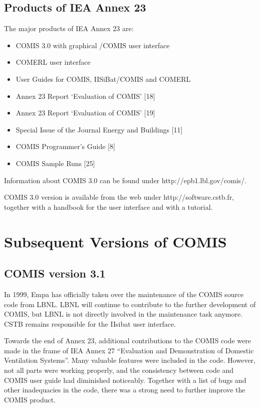 \documentclass[10pt]{book}
\begin{document}
\subsection{Products of IEA Annex 23}

The major products of IEA Annex 23 are:

\begin{itemize}
\item COMIS 3.0 with graphical /COMIS user interface
\item COMERL user interface
\item User Guides for COMIS, IISiBat/COMIS and COMERL
\item Annex 23 Report `Evaluation of COMIS' [18]
\item Annex 23 Report `Evaluation of COMIS' [19]
\item Special Issue of the Journal Energy and Buildings [11]
\item COMIS Programmer's Guide [8]
\item COMIS Sample Runs [25]
\end{itemize}

Information about COMIS 3.0 can be found under http://epb1.lbl.gov/comis/. 

COMIS 3.0 version is available from the web under http://software.cstb.fr, together with a handbook for the user interface and with a tutorial. 

\section{Subsequent Versions of COMIS}

\subsection{COMIS version 3.1}

In 1999, Empa has officially taken over the maintenance of the COMIS source code from LBNL. LBNL will continue to contribute to the further development of COMIS, but LBNL is not directly involved in the maintenance task anymore. CSTB remains responsible for the IIsibat user interface.

Towards the end of Annex 23, additional contributions to the COMIS code were made in the frame of IEA Annex 27 ``Evaluation and Demonstration of Domestic Ventilation Systems''. Many valuable features were included in the code. However, not all parts were working properly, and the consistency between code and COMIS user guide had diminished noticeably. Together with a list of bugs and other inadequacies in the code, there was a strong need to further improve the COMIS product. 
\end{document}
